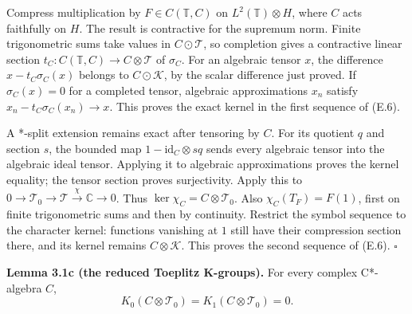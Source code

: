 \documentclass[
  11pt,
]{article}
\begin{document}
Compress multiplication by \(F\in C(\mathbb T,C)\) on
\(L^2(\mathbb T)\otimes H\), where \(C\) acts faithfully on \(H\). The
result is contractive for the supremum norm. Finite trigonometric sums
take values in \(C\odot\mathcal T\), so completion gives a contractive
linear section \(t_C:C(\mathbb T,C)\to C\otimes\mathcal T\) of
\(\sigma_C\). For an algebraic tensor \(x\), the difference
\(x-t_C\sigma_C(x)\) belongs to \(C\odot\mathcal K\), by the scalar
difference just proved. If \(\sigma_C(x)=0\) for a completed tensor,
algebraic approximations \(x_n\) satisfy \(x_n-t_C\sigma_C(x_n)\to x\).
This proves the exact kernel in the first sequence of (E.6).

A *-split extension remains exact after tensoring by \(C\). For its
quotient \(q\) and section \(s\), the bounded map
\(1-\mathrm{id}_C\otimes sq\) sends every algebraic tensor into the
algebraic ideal tensor. Applying it to algebraic approximations proves
the kernel equality; the tensor section proves surjectivity. Apply this
to \(0\to\mathcal T_0\to\mathcal T\xrightarrow{\chi}\mathbb C\to0\).
Thus \(\ker\chi_C=C\otimes\mathcal T_0\). Also \(\chi_C(T_F)=F(1)\),
first on finite trigonometric sums and then by continuity. Restrict the
symbol sequence to the character kernel: functions vanishing at \(1\)
still have their compression section there, and its kernel remains
\(C\otimes\mathcal K\). This proves the second sequence of (E.6).
\(\square\)

\textbf{Lemma 3.1c (the reduced Toeplitz K-groups).} For every complex
C*-algebra \(C\), \[
K_0(C\otimes\mathcal T_0)=K_1(C\otimes\mathcal T_0)=0.
\tag{E.7}
\]
\end{document}
